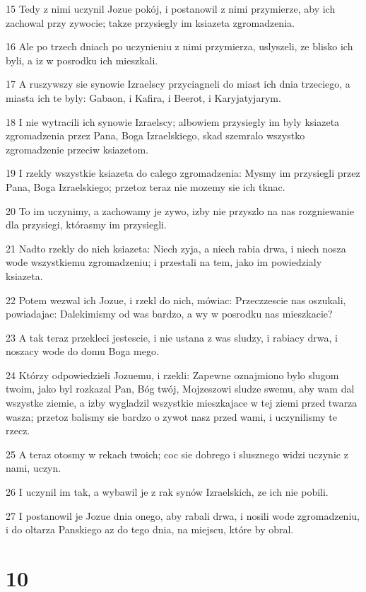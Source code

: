 \par 15 Tedy z nimi uczynil Jozue pokój, i postanowil z nimi przymierze, aby ich zachowal przy zywocie; takze przysiegly im ksiazeta zgromadzenia.
\par 16 Ale po trzech dniach po uczynieniu z nimi przymierza, uslyszeli, ze blisko ich byli, a iz w posrodku ich mieszkali.
\par 17 A ruszywszy sie synowie Izraelscy przyciagneli do miast ich dnia trzeciego, a miasta ich te byly: Gabaon, i Kafira, i Beerot, i Karyjatyjarym.
\par 18 I nie wytracili ich synowie Izraelscy; albowiem przysiegly im byly ksiazeta zgromadzenia przez Pana, Boga Izraelskiego, skad szemralo wszystko zgromadzenie przeciw ksiazetom.
\par 19 I rzekly wszystkie ksiazeta do calego zgromadzenia: Mysmy im przysiegli przez Pana, Boga Izraelskiego; przetoz teraz nie mozemy sie ich tknac.
\par 20 To im uczynimy, a zachowamy je zywo, izby nie przyszlo na nas rozgniewanie dla przysiegi, którasmy im przysiegli.
\par 21 Nadto rzekly do nich ksiazeta: Niech zyja, a niech rabia drwa, i niech nosza wode wszystkiemu zgromadzeniu; i przestali na tem, jako im powiedzialy ksiazeta.
\par 22 Potem wezwal ich Jozue, i rzekl do nich, mówiac: Przeczzescie nas oszukali, powiadajac: Dalekimismy od was bardzo, a wy w posrodku nas mieszkacie?
\par 23 A tak teraz przekleci jestescie, i nie ustana z was sludzy, i rabiacy drwa, i noszacy wode do domu Boga mego.
\par 24 Którzy odpowiedzieli Jozuemu, i rzekli: Zapewne oznajmiono bylo slugom twoim, jako byl rozkazal Pan, Bóg twój, Mojzeszowi sludze swemu, aby wam dal wszystke ziemie, a izby wygladzil wszystkie mieszkajace w tej ziemi przed twarza wasza; przetoz balismy sie bardzo o zywot nasz przed wami, i uczynilismy te rzecz.
\par 25 A teraz otosmy w rekach twoich; coc sie dobrego i slusznego widzi uczynic z nami, uczyn.
\par 26 I uczynil im tak, a wybawil je z rak synów Izraelskich, ze ich nie pobili.
\par 27 I postanowil je Jozue dnia onego, aby rabali drwa, i nosili wode zgromadzeniu, i do oltarza Panskiego az do tego dnia, na miejscu, które by obral.

\chapter{10}

